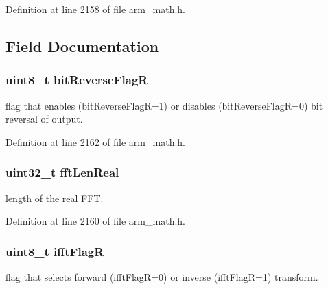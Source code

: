 Definition at line 2158 of file arm\+\_\+math.\+h.



\subsection{Field Documentation}
\subsubsection[{\texorpdfstring{bit\+Reverse\+FlagR}{bitReverseFlagR}}]{\setlength{\rightskip}{0pt plus 5cm}uint8\+\_\+t bit\+Reverse\+FlagR}\hypertarget{structarm__rfft__instance__q15_ad56ec2425e2422108b8767b43d944591}{}\label{structarm__rfft__instance__q15_ad56ec2425e2422108b8767b43d944591}
flag that enables (bit\+Reverse\+FlagR=1) or disables (bit\+Reverse\+FlagR=0) bit reversal of output. 

Definition at line 2162 of file arm\+\_\+math.\+h.

\subsubsection[{\texorpdfstring{fft\+Len\+Real}{fftLenReal}}]{\setlength{\rightskip}{0pt plus 5cm}uint32\+\_\+t fft\+Len\+Real}\hypertarget{structarm__rfft__instance__q15_adf0d4604cf5546075d9d4cf122d6c986}{}\label{structarm__rfft__instance__q15_adf0d4604cf5546075d9d4cf122d6c986}
length of the real F\+FT. 

Definition at line 2160 of file arm\+\_\+math.\+h.

\subsubsection[{\texorpdfstring{ifft\+FlagR}{ifftFlagR}}]{\setlength{\rightskip}{0pt plus 5cm}uint8\+\_\+t ifft\+FlagR}\hypertarget{structarm__rfft__instance__q15_a787d72055c89e4d62b188d6bd646341c}{}\label{structarm__rfft__instance__q15_a787d72055c89e4d62b188d6bd646341c}
flag that selects forward (ifft\+FlagR=0) or inverse (ifft\+FlagR=1) transform. 

